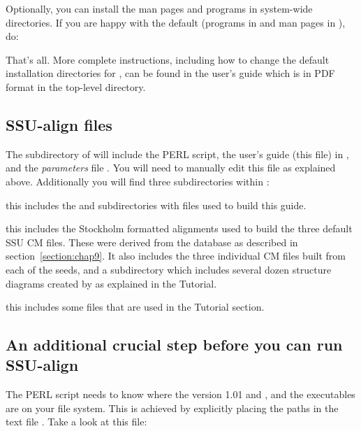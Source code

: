 Optionally, you can install the man pages and programs in system-wide
directories. If you are happy with the default (programs in
 and man pages in ),
do:


That's all.  More complete instructions, including how to
change the default installation directories for ,
can be found in the  user's guide which is in 
PDF format in the top-level  directory. 

\subsection{SSU-align files}
The  subdirectory of  will include
the  PERL script, the user's guide (this file) in
, and the \emph{parameters} file 
. You will need to manually edit this file as
explained above. Additionally you will find three subdirectories
within :

\begin{wideitem}

\item[\emprog{documentation}] this includes the  and
   subdirectories with files used to build this
  guide.

\item[\emprog{seeds}] this includes the Stockholm formatted alignments
  used to build the three default SSU CM files. These were derived
  from the  database \cite{CannoneGutell02} as described in
  section~\ref{section:chap9}. It also includes the three individual CM
  files built from each of the seeds, and a subdirectory
   which includes several dozen structure diagrams
  created by  as explained in the Tutorial.

\item[\emprog{tutorial}] this includes some files that are used in the
  Tutorial section.

\end{wideitem}

\subsection{An additional crucial step before you
can run SSU-align}

The  PERL script needs to know where the
 version 1.01  and , and
the   executables are on your file
system. This is achieved by explicitly placing the paths in the text
file . Take a look at this file:


